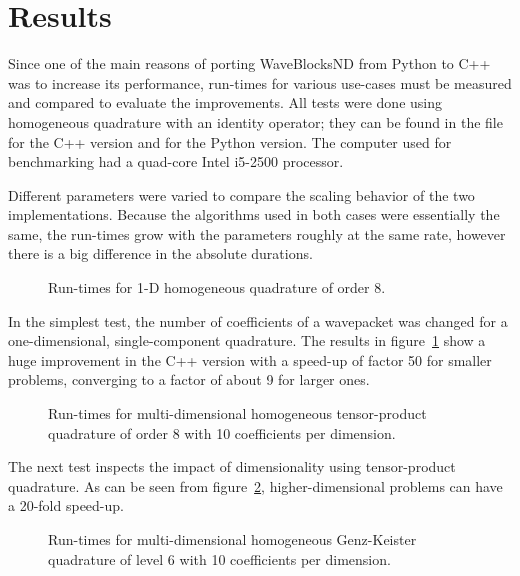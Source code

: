 \section{Results}
\label{sec:results}

Since one of the main reasons of porting WaveBlocksND from Python to C++ was to
increase its performance, run-times for various use-cases must be measured and
compared to evaluate the improvements.
All tests were done using homogeneous quadrature with an identity operator;
they can be found in the file  for the
C++ version and  for the Python version.
The computer used for benchmarking had a quad-core Intel i5-2500 processor.

Different parameters were varied to compare the scaling behavior of the two
implementations.
Because the algorithms used in both cases were essentially the same, the
run-times grow with the parameters roughly at the same rate, however there is a
big difference in the absolute durations.

\begin{figure}
  \center
  
  \caption{Run-times for 1-D homogeneous quadrature of order 8.}
  \label{fig:speedup1d}
\end{figure}

In the simplest test, the number of coefficients of a wavepacket was changed
for a one-dimensional, single-component quadrature.
The results in figure~\ref{fig:speedup1d} show a huge improvement in the C++
version with a speed-up of factor 50 for smaller problems, converging to a
factor of about 9 for larger ones.

\begin{figure}
  \center
  
  \caption{Run-times for multi-dimensional homogeneous tensor-product quadrature
    of order 8 with 10 coefficients per dimension.}
  \label{fig:speedupnd}
\end{figure}

The next test inspects the impact of dimensionality using tensor-product
quadrature.
As can be seen from figure~\ref{fig:speedupnd}, higher-dimensional problems can
have a 20-fold speed-up.

\begin{figure}
  \center
  
  \caption{Run-times for multi-dimensional homogeneous Genz-Keister quadrature
    of level 6 with 10 coefficients per dimension.}
  \label{fig:speedupgenzkeister}
\end{figure}

